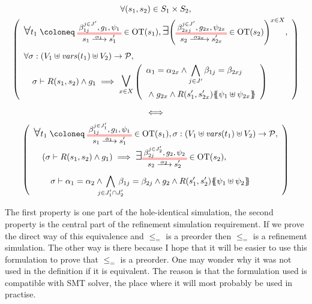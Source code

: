 \documentclass{article}
\begin{document}
\begin{lem}
\begin{gather*}
\forall \mpar{s_1, s_2} \in S_1 \times S_2, \\
\mpar{\everymath{\displaystyle}\begin{array}{l}
	\bigsymb{\forall} t_1 \defobject \OTx{1}{}{1}{} \in \fOT{s_1}, \bigsymb{\exists} \mpar{\OTx{2}{x}{2x}{} \in \fOT{s_2}}^{x \in X}, \\[12pt]
	\forall \sigma: \mpar{V_1 \uplus \fvars{t_1} \uplus V_2} \to \values, \\
	\quad \sigma \vdash R\mpar{s_1, s_2} \wedge g_1 \implies \operatorname*{\bigsymb{\bigvee}}_{x \in X} \mpar{\begin{array}{l}
		\alpha_1 = \alpha_{2x} \wedge \bigwedge_{j \in J'} \beta_{1j} = \beta_{2xj} \\[12pt]
		\nwedge g_{2x} \wedge R\mpar{s'_1, s'_{2x}}\psubst{\psi_1 \uplus \psi_{2x}}
	\end{array}}
\end{array}} \\
\iff \\
\mpar{\everymath{\displaystyle}\begin{array}{l}
	\bigsymb{\forall} t_1 \defobject \OTx{1}{}{1}{1} \in \fOT{s_1}, \sigma: \mpar{V_1 \uplus \fvars{t_1} \uplus V_2} \to \values, \\[6pt]
	\quad \mpar{\sigma \vdash R\mpar{s_1, s_2} \wedge g_1} \implies \bigsymb{\exists} \OTx{2}{}{2}{2} \in \fOT{s_2}, \\[12pt]
	\qquad \sigma \vdash \alpha_1 = \alpha_2 \wedge \bigwedge_\subbox{j \in J'_1 \cap J'_2} \beta_{1j} = \beta_{2j} \wedge g_2 \wedge R\mpar{s'_1, s'_2}\psubst{\psi_1 \uplus \psi_2}
\end{array}}
\end{gather*}
\end{lem}
The first property is one part of the hole-identical simulation, the second property is the central part of the refinement simulation requirement.
If we prove the direct way of this equivalence and \(\leq_=\) is a preorder then \(\leq_=\) is a refinement simulation.
The other way is there because I hope that it will be easier to use this formulation to prove that \(\leq_=\) is a preorder. %
One may wonder why it was not used in the definition if it is equivalent.
The reason is that the formulation used is compatible with SMT solver, the place where it will most probably be used in practise.
\end{document}
